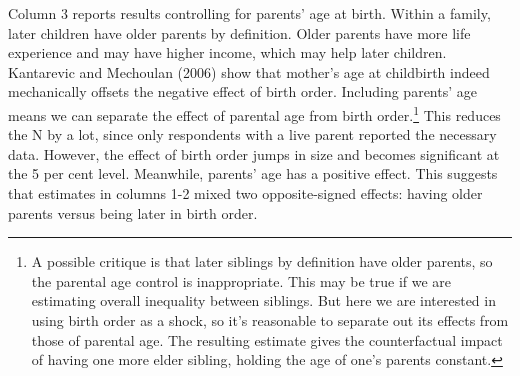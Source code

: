 \documentclass[
  12pt,
]{article}
\theoremstyle{definition}
\theoremstyle{definition}
\theoremstyle{definition}
\theoremstyle{definition}
\theoremstyle{remark}
\begin{document}
Column 3 reports results controlling for parents' age at birth. Within a
family, later children have older parents by definition. Older parents
have more life experience and may have higher income, which may help
later children. Kantarevic and Mechoulan (2006) show that mother's age at
childbirth indeed mechanically offsets the negative effect of birth
order. Including parents' age means we can separate the effect of
parental age from birth order.\footnote{A possible critique is that later siblings by definition have
  older parents, so the parental age control is inappropriate. This
  may be true if we are estimating overall inequality between
  siblings. But here we are interested in using birth order as a
  shock, so it's reasonable to separate out its effects from those of
  parental age. The resulting estimate gives the counterfactual impact
  of having one more elder sibling, holding the age of one's parents
  constant.} This reduces the N by a lot, since
only respondents with a live parent reported the necessary data.
However, the effect of birth order jumps in size and becomes significant
at the 5 per cent level. Meanwhile, parents' age has a positive effect.
This suggests that estimates in columns 1-2 mixed two opposite-signed
effects: having older parents versus being later in birth order.

 
  \providecommand{\huxb}[2]{\arrayrulecolor[RGB]{#1}\global\arrayrulewidth=#2pt}
  \providecommand{\huxvb}[2]{\color[RGB]{#1}\vrule width #2pt}
  \providecommand{\huxtpad}[1]{\rule{0pt}{#1}}
  \providecommand{\huxbpad}[1]{\rule[-#1]{0pt}{#1}}
\end{document}
